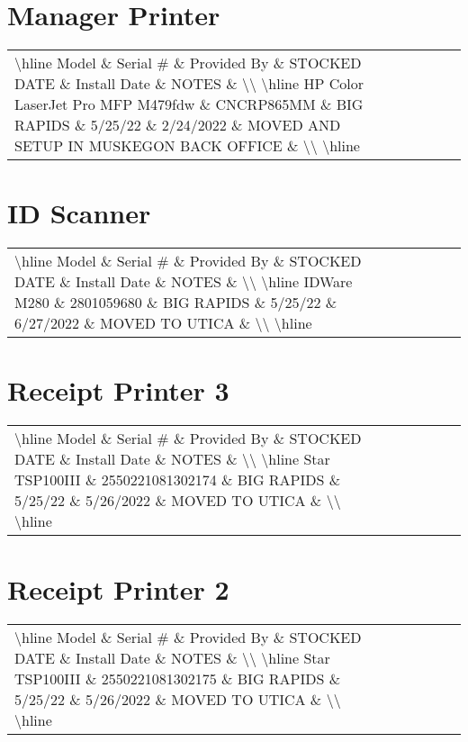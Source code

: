 \documentclass{article}%
\begin{document}
%
\section{Manager Printer}%
\label{sec:ManagerPrinter}%
\begin{tabularx}{\textwidth}{|X|X|X|X|X|X|X|}%
\textbackslash{}hline%
Model \& Serial \# \& Provided By \& STOCKED DATE \& Install Date \& NOTES \&  \textbackslash{}\textbackslash{}%
\textbackslash{}hline%
HP Color LaserJet Pro MFP M479fdw \& CNCRP865MM \& BIG RAPIDS \& 5/25/22 \& 2/24/2022 \& MOVED AND SETUP IN MUSKEGON BACK OFFICE \&  \textbackslash{}\textbackslash{}%
\textbackslash{}hline%
\end{tabularx}

%
\section{ID Scanner}%
\label{sec:IDScanner}%
\begin{tabularx}{\textwidth}{|X|X|X|X|X|X|X|}%
\textbackslash{}hline%
Model \& Serial \# \& Provided By \& STOCKED DATE \& Install Date \& NOTES \&  \textbackslash{}\textbackslash{}%
\textbackslash{}hline%
IDWare M280 \& 2801059680 \& BIG RAPIDS \& 5/25/22 \& 6/27/2022 \& MOVED TO UTICA \&  \textbackslash{}\textbackslash{}%
\textbackslash{}hline%
\end{tabularx}

%
\section{Receipt Printer 3}%
\label{sec:ReceiptPrinter3}%
\begin{tabularx}{\textwidth}{|X|X|X|X|X|X|X|}%
\textbackslash{}hline%
Model \& Serial \# \& Provided By \& STOCKED DATE \& Install Date \& NOTES \&  \textbackslash{}\textbackslash{}%
\textbackslash{}hline%
Star TSP100III \& 2550221081302174 \& BIG RAPIDS \& 5/25/22 \& 5/26/2022 \& MOVED TO UTICA \&  \textbackslash{}\textbackslash{}%
\textbackslash{}hline%
\end{tabularx}

%
\section{Receipt Printer 2}%
\label{sec:ReceiptPrinter2}%
\begin{tabularx}{\textwidth}{|X|X|X|X|X|X|X|}%
\textbackslash{}hline%
Model \& Serial \# \& Provided By \& STOCKED DATE \& Install Date \& NOTES \&  \textbackslash{}\textbackslash{}%
\textbackslash{}hline%
Star TSP100III \& 2550221081302175 \& BIG RAPIDS \& 5/25/22 \& 5/26/2022 \& MOVED TO UTICA \&  \textbackslash{}\textbackslash{}%
\textbackslash{}hline%
\end{tabularx}
\end{document}
